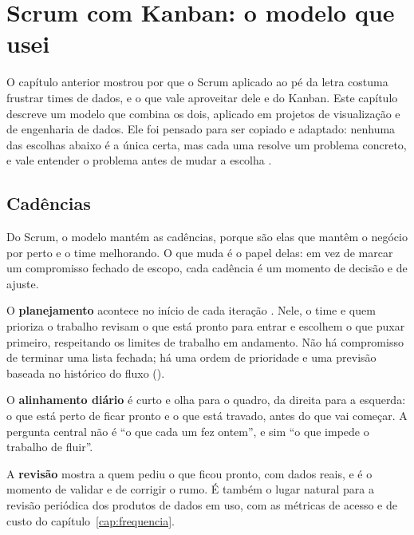 \chapter{Scrum com Kanban: o modelo que usei}
\label{cap:scrumban}


O capítulo anterior mostrou por que o Scrum aplicado ao pé da letra costuma frustrar times de
dados, e o que vale aproveitar dele e do Kanban. Este capítulo descreve um modelo que combina
os dois, aplicado em projetos de visualização e de engenharia de dados. Ele foi pensado para
ser copiado e adaptado: nenhuma das escolhas abaixo é a única certa, mas cada uma resolve um
problema concreto, e vale entender o problema antes de mudar a escolha \parencite{ladas2009}.

\section{Cadências}
\label{sec:cadencias}

Do Scrum, o modelo mantém as cadências, porque são elas que mantêm o negócio por perto e o
time melhorando. O que muda é o papel delas: em vez de marcar um compromisso fechado de
escopo, cada cadência é um momento de decisão e de ajuste.

O \textbf{planejamento} acontece no início de cada iteração . Nele, o time e quem prioriza o trabalho revisam o que está pronto para entrar
e escolhem o que puxar primeiro, respeitando os limites de trabalho em andamento. Não há
compromisso de terminar uma lista fechada; há uma ordem de prioridade e uma previsão baseada
no histórico do fluxo ().

O \textbf{alinhamento diário} é curto e olha para o quadro, da direita para a esquerda: o que
está perto de ficar pronto e o que está travado, antes do que vai começar. A pergunta central
não é \enquote{o que cada um fez ontem}, e sim \enquote{o que impede o trabalho de fluir}.

A \textbf{revisão} mostra a quem pediu o que ficou pronto, com dados reais, e é o momento de
validar e de corrigir o rumo. É também o lugar natural para a revisão periódica dos produtos
de dados em uso, com as métricas de acesso e de custo do capítulo~\ref{cap:frequencia}.

